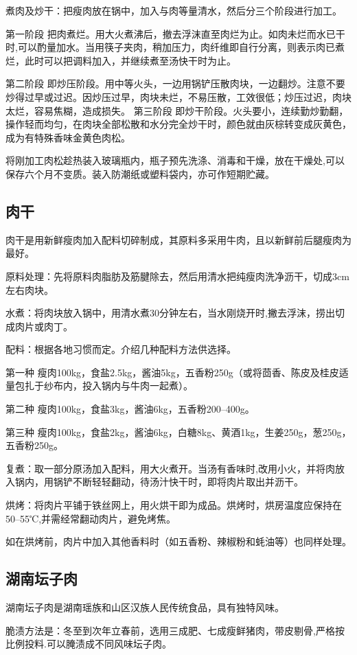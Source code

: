 \documentclass{ctexbook}
\begin{document}
煮肉及炒干：把瘦肉放在锅中，加入与肉等量清水，然后分三个阶段进行加工。

第一阶段 把肉煮烂。用大火煮沸后，撤去浮沫直至肉烂为止。如肉未烂而水已干时,可以酌量加水。当用筷子夹肉，稍加压力，肉纤维即自行分离，则表示肉已煮烂，此时可以把调料加入，并继续煮至汤快干时为止。

第二阶段 即炒压阶段。用中等火头，一边用锅铲压散肉块，一边翻炒。注意不要炒得过早或过迟。因炒压过早，肉块未烂，不易压散，工效很低；炒压过迟，肉块太烂，容易焦糊，造成损失。
第三阶段 即炒干阶段。火头要小，连续勤炒勤翻，操作轻而均匀，在肉块全部松散和水分完全炒干时，颜色就由灰棕转变成灰黄色，成为有特殊香味金黄色肉松。

将刚加工肉松趁热装入玻璃瓶内，瓶子预先洗涤、消毒和干燥，放在干燥处,可以保存六个月不变质。装入防潮纸或塑料袋内，亦可作短期贮藏。
\subsection{肉干}
肉干是用新鲜瘦肉加入配料切碎制成，其原料多采用牛肉，且以新鲜前后腿瘦肉为最好。

原料处理：先将原料肉脂肪及筋腱除去，然后用清水把纯瘦肉洗净沥干，切成3cm左右肉块。

水煮：将肉块放入锅中，用清水煮30分钟左右，当水刚烧开时,撇去浮沫，捞出切成肉片或肉丁。

配料：根据各地习惯而定。介绍几种配料方法供选择。

第一种 瘦肉100kg，食盐2.5kg，酱油5kg，五香粉250g（或将茴香、陈皮及桂皮适量包扎于纱布内，投入锅内与牛肉一起煮）。

第二种 瘦肉100kg，食盐3kg，酱油6kg，五香粉200--400g。

第三种 瘦肉100kg，食盐2kg，酱油6kg，白糖8kg、黄酒1kg，生姜250g，葱250g，五香粉250g。

复煮：取一部分原汤加入配料，用大火煮开。当汤有香味时,改用小火，并将肉放入锅内，用锅铲不断轻轻翻动，待汤汁快干时，即将肉片取出并沥干。

烘烤：将肉片平铺于铁丝网上，用火烘干即为成品。烘烤时，烘房温度应保持在50--55℃,并需经常翻动肉片，避免烤焦。

如在烘烤前，肉片中加入其他香料时（如五香粉、辣椒粉和蚝油等）也同样处理。

\subsection{湖南坛子肉}
湖南坛子肉是湖南瑶族和山区汉族人民传统食品，具有独特风味。

脆渍方法是：冬至到次年立春前，选用三成肥、七成瘦鲜猪肉，带皮剔骨,严格按比例投料.可以腌渍成不同风味坛子肉。
\end{document}
